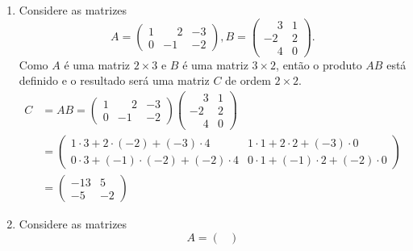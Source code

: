 \begin{exemplos}
    \begin{enumerate}[label={\arabic*})]
        \item Considere as matrizes
            \[
                A = \begin{pmatrix}
                    1 & \phantom{-}2 & -3\\
                    0 & -1 & -2
                \end{pmatrix},
                B = \begin{pmatrix}
                    \phantom{-}3 & 1\\
                    -2 & 2\\
                    \phantom{-}4 & 0
                \end{pmatrix}.
            \]
            Como $A$ é uma matriz $2 \times 3$ e $B$ é uma matriz $3 \times 2$, então o produto $AB$ está definido e o resultado será uma
            matriz $C$ de ordem $2 \times 2$.
            \begin{align*}
                C &= AB = \begin{pmatrix}
                    1 & \phantom{-}2 & -3\\
                    0 & -1 & -2
                \end{pmatrix}
                \begin{pmatrix}
                    \phantom{-}3 & 1\\
                    -2 & 2\\
                    \phantom{-}4 & 0
                \end{pmatrix} \\ &=
                \begin{pmatrix}
                    1\cdot 3 + 2\cdot(-2) + (-3)\cdot4 & 1\cdot 1 + 2\cdot 2 + (-3)\cdot 0\\
                    0\cdot 3 + (-1)\cdot(-2) + (-2) \cdot 4 & 0\cdot 1 + (-1)\cdot 2 + (-2)\cdot 0
                    \end{pmatrix}\\ &= \begin{pmatrix}
                        -13 & 5\\
                        -5 & -2
                    \end{pmatrix}
                \end{align*}
        \item Considere as matrizes
            \[
                A = \begin{pmatrix}

\end{pmatrix}\]
\end{enumerate}
\end{exemplos}
